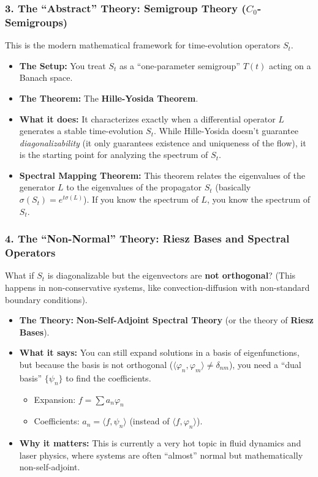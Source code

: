\documentclass[oneside]{book}
\renewcommand{\phi}{\varphi}
\begin{document}
\subsubsection*{3. The ``Abstract'' Theory: Semigroup Theory ($C_0$-Semigroups)}
This is the modern mathematical framework for time-evolution operators $S_t$.

\begin{itemize}
    \item \textbf{The Setup:} You treat $S_t$ as a ``one-parameter semigroup'' $T(t)$ acting on a Banach space.
    \item \textbf{The Theorem:} The \textbf{Hille-Yosida Theorem}.
    \item \textbf{What it does:} It characterizes exactly when a differential operator $L$ generates a stable time-evolution $S_t$. While Hille-Yosida doesn't guarantee \textit{diagonalizability} (it only guarantees existence and uniqueness of the flow), it is the starting point for analyzing the spectrum of $S_t$.
    \item \textbf{Spectral Mapping Theorem:} This theorem relates the eigenvalues of the generator $L$ to the eigenvalues of the propagator $S_t$ (basically $\sigma(S_t) = e^{t \sigma(L)}$). If you know the spectrum of $L$, you know the spectrum of $S_t$.
\end{itemize}

\subsubsection*{4. The ``Non-Normal'' Theory: Riesz Bases and Spectral Operators}
What if $S_t$ is diagonalizable but the eigenvectors are \textbf{not orthogonal}? (This happens in non-conservative systems, like convection-diffusion with non-standard boundary conditions).

\begin{itemize}
    \item \textbf{The Theory:} \textbf{Non-Self-Adjoint Spectral Theory} (or the theory of \textbf{Riesz Bases}).
    \item \textbf{What it says:} You can still expand solutions in a basis of eigenfunctions, but because the basis is not orthogonal ($ \langle \phi_n, \phi_m \rangle \neq \delta_{nm} $), you need a ``dual basis'' $\{\psi_n\}$ to find the coefficients.
    \begin{itemize}
        \item Expansion: $f = \sum a_n \phi_n$
        \item Coefficients: $a_n = \langle f, \psi_n \rangle$ (instead of $\langle f, \phi_n \rangle$).
    \end{itemize}
    \item \textbf{Why it matters:} This is currently a very hot topic in fluid dynamics and laser physics, where systems are often ``almost'' normal but mathematically non-self-adjoint.
\end{itemize}
\end{document}

